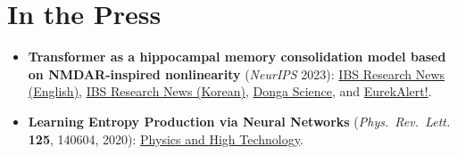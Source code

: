 \documentclass[11pt,letterpaper]{article}
\begin{document}
\section{In the Press}
\begin{itemize}[itemsep=2pt]
    \item \textbf{Transformer as a hippocampal memory consolidation model based on NMDAR-inspired nonlinearity}
    (\textit{NeurIPS} 2023):
    \href{https://www.ibs.re.kr/cop/bbs/BBSMSTR_000000000738/selectBoardArticle.do?nttId=24264\&pageIndex=1\&searchCnd=\&searchWrd=}{IBS Research News (English)},
    \href{https://www.ibs.re.kr/cop/bbs/BBSMSTR_000000000735/selectBoardArticle.do?nttId=24270\&pageIndex=1\&searchCnd=\&searchWrd=}{IBS Research News (Korean)},
    \href{http://m.dongascience.com/news.php?idx=62694}{Donga Science}, and
    \href{https://www.eurekalert.org/news-releases/1029300}{EurekAlert!}.

    \item \textbf{Learning Entropy Production via Neural Networks}
    (\textit{Phys.\ Rev.\ Lett.} \textbf{125}, 140604, 2020):
    \href{https://webzine.kps.or.kr/?p=5_view\&idx=16495/}{Physics and High Technology}.
\end{itemize}

\end{document}
